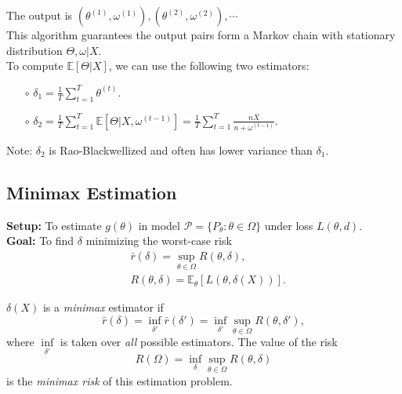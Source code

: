 \documentclass[a4paper]{article}
\begin{document}
\begin{answer}
\begin{enumerate}
\begin{itemize}
\begin{itemize}
				\end{itemize}
		\end{itemize}
		The output is $(\theta^{(1)},\omega^{(1)}),(\theta^{(2)},\omega^{(2)}),\cdots$\\
		This algorithm guarantees the output pairs form a Markov chain with stationary distribution $\Theta,\omega|X$.\\
		To compute $\mathbb{E}[\Theta|X]$, we can use the following two estimators:
		\begin{itemize}
			\item[$\circ$] $\delta_1 = \frac{1}{T}\sum\limits_{t = 1}^T \theta^{(t)}$.
			\item[$\circ$] $\delta_2 = \frac{1}{T}\sum\limits_{t = 1}^T \mathbb{E}[\Theta|X,\omega^{(t-1)}] = \frac{1}{T}\sum\limits_{t = 1}^T \frac{n \bar{X}}{n+\omega^{(t-1)}}$.
		\end{itemize}
		Note: $\delta_2$ is Rao-Blackwellized and often has lower variance than $\delta_1$.
	\end{enumerate}
\end{answer}

\subsection{Minimax Estimation}
\textbf{Setup:} To estimate $g(\theta)$ in model $\mathcal{P} = \{P_\theta: \theta \in \Omega \}$ under loss $L(\theta,d)$. \\
\textbf{Goal:} To find $\delta$ minimizing the worst-case risk
\begin{equation}
	\begin{aligned}
		& \bar{r}(\delta) = \sup\limits_{\theta \in \Omega} R(\theta,\delta), \\
		& R(\theta,\delta) = \mathbb{E}_\theta[L(\theta,\delta(X))].
	\end{aligned}
\end{equation}

\begin{defi}[Minimax]
	$\delta(X)$ is a \emph{minimax} estimator if
	\begin{equation}
		\bar{r}(\delta) = \inf\limits_{\delta'} \bar{r}(\delta') = \inf\limits_{\delta'} \sup\limits_{\theta \in \Omega} R(\theta,\delta'),
	\end{equation}
	where $\inf\limits_{\delta'}$ is taken over \emph{all} possible estimators. The value of the risk
	\begin{equation}
		R(\Omega) = \inf\limits_{\delta} \sup\limits_{\theta \in \Omega} R(\theta,\delta)
	\end{equation}
	is the \emph{minimax risk} of this estimation problem.
\end{defi}
\end{document}
